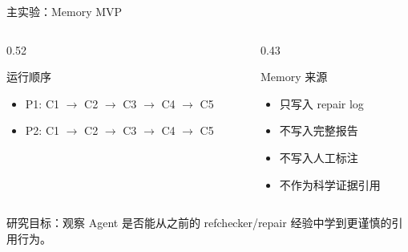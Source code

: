 \documentclass[UTF8,fontset=fandol,aspectratio=169]{ctexbeamer}
\begin{document}
\begin{frame}{主实验：Memory MVP}
  \begin{columns}[T,onlytextwidth]
    \begin{column}{0.52\textwidth}
      \begin{block}{运行顺序}
        \begin{itemize}
          \item P1: C1 $\rightarrow$ C2 $\rightarrow$ C3 $\rightarrow$ C4 $\rightarrow$ C5
          \item P2: C1 $\rightarrow$ C2 $\rightarrow$ C3 $\rightarrow$ C4 $\rightarrow$ C5
        \end{itemize}
      \end{block}
    \end{column}
    \begin{column}{0.43\textwidth}
      \begin{block}{Memory 来源}
        \begin{itemize}
          \item 只写入 repair log
          \item 不写入完整报告
          \item 不写入人工标注
          \item 不作为科学证据引用
        \end{itemize}
      \end{block}
    \end{column}
  \end{columns}

  \vspace{0.5em}
  研究目标：观察 Agent 是否能从之前的 refchecker/repair 经验中学到更谨慎的引用行为。
\end{frame}
\end{document}
